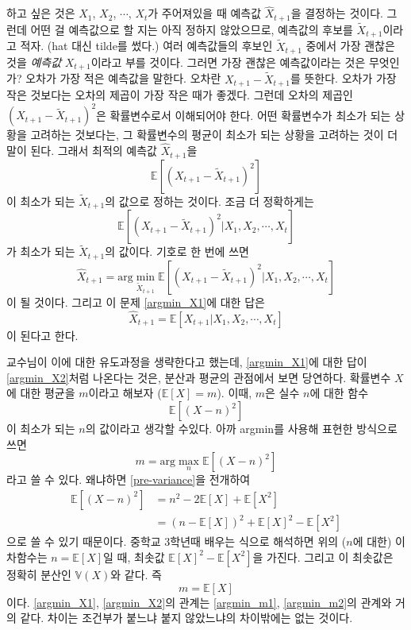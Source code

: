 \documentclass{article}
\begin{document}
하고 싶은 것은 \(X_1\), \(X_2\), \(\cdots\), \(X_t\)가 주어져있을 때 예측값 \(\hat X_{t+1}\)을 결정하는 것이다.
그런데 어떤 걸 예측값으로 할 지는 아직 정하지 않았으므로, 예측값의 후보를 \(\tilde X_{t+1}\)이라고 적자.
(hat 대신 tilde를 썼다.)
여러 예측값들의 후보인 \(\tilde X_{t+1}\) 중에서 가장 괜찮은 것을 \emph{예측값} \(X_{t+1}\)이라고 부를 것이다.
그러면 가장 괜찮은 예측값이라는 것은 무엇인가? 오차가 가장 적은 예측값을 말한다.
오차란 \(X_{t+1}-\tilde X_{t+1}\)를 뜻한다.
오차가 가장 작은 것보다는 오차의 제곱이 가장 작은 때가 좋겠다.
그런데 오차의 제곱인 \(\left(X_{t+1}-\tilde X_{t+1}\right)^2\)은 확률변수로서 이해되어야 한다.
어떤 확률변수가 최소가 되는 상황을 고려하는 것보다는, 그 확률변수의 평균이 최소가 되는 상황을 고려하는 것이 더 말이 된다.
그래서 최적의 예측값 \(\hat X_{t+1}\)을
\[\mathbb E\left[(X_{t+1}-\tilde X_{t+1})^2\right]\]
이 최소가 되는 \(\tilde X_{t+1}\)의 값으로 정하는 것이다.
조금 더 정확하게는
\[\mathbb E\left[(X_{t+1}-\tilde X_{t+1})^2|X_1,X_2,\cdots,X_t\right]\]
가 최소가 되는 \(\tilde X_{t+1}\)의 값이다.
기호로 한 번에 쓰면
\begin{equation}\label{argmin_X1}
\hat X_{t+1}=\text{arg}\min_{\tilde X_{t+1}}\mathbb E\left[(X_{t+1}-\tilde X_{t+1})^2|X_1,X_2,\cdots,X_t\right]
\end{equation}
이 될 것이다.
그리고 이 문제 \eqref{argmin_X1}에 대한 답은
\begin{equation}\label{argmin_X2}
\hat X_{t+1}=\mathbb E[X_{t+1}|X_1,X_2,\cdots,X_t]
\end{equation}
이 된다고 한다.

교수님이 이에 대한 유도과정을 생략한다고 했는데, \eqref{argmin_X1}에 대한 답이 \eqref{argmin_X2}처럼 나온다는 것은, 분산과 평균의 관점에서 보면 당연하다.
확률변수 \(X\)에 대한 평균을 \(m\)이라고 해보자 (\(\mathbb E[X]=m\)).
이때, \(m\)은 실수 \(n\)에 대한 함수
\begin{equation}\label{pre-variance}
\mathbb E[(X-n)^2]
\end{equation}
이 최소가 되는 \(n\)의 값이라고 생각할 수있다.
아까 argmin를 사용해 표현한 방식으로 쓰면
\begin{equation}\label{argmin_m1}
m=\text{arg}\max_{n}\mathbb E[(X-n)^2]
\end{equation}
라고 쓸 수 있다.
왜냐하면 \eqref{pre-variance}을 전개하여
\begin{align*}
\mathbb E[(X-n)^2]
&=n^2-2\mathbb E[X]+\mathbb E[X^2]\\
&=\left(n-\mathbb E[X]\right)^2+\mathbb E[X]^2-\mathbb E[X^2]
\end{align*}
으로 쓸 수 있기 때문이다.
중학교 3학년때 배우는 식으로 해석하면 위의 (\(n\)에 대한) 이차함수는 \(n=\mathbb E[X]\)일 때, 최솟값 \(\mathbb E[X]^2-\mathbb E[X^2]\)을 가진다.
그리고 이 최솟값은 정확히 분산인 \(\mathbb V(X)\)와 같다.
즉
\begin{equation}\label{argmin_m2}
m=\mathbb E[X]
\end{equation}
이다.
\eqref{argmin_X1}, \eqref{argmin_X2}의 관계는 \eqref{argmin_m1}, \eqref{argmin_m2}의 관계와 거의 같다.
차이는 조건부가 붙느냐 붙지 않았느냐의 차이밖에는 없는 것이다.
\end{document}
